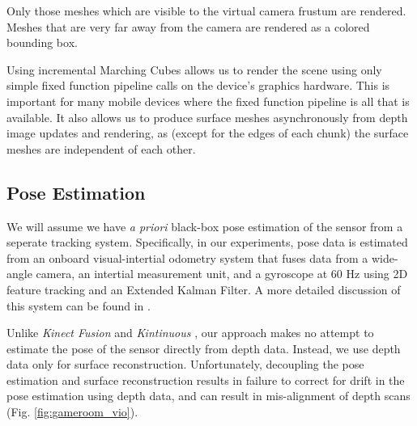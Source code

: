\documentclass[10pt,twocolumn,letterpaper]{article}
\begin{document}
Only those meshes which are visible to the virtual camera frustum are rendered.
Meshes that are very far away from the camera are rendered as a colored bounding
box.

Using incremental Marching Cubes allows us to render the scene using only simple
fixed function pipeline calls on the device's graphics hardware. This is
important for many mobile devices where the fixed function pipeline is all that
is available. It also allows us to produce surface meshes asynchronously from
depth image updates and rendering, as (except for the edges of  each chunk) the
surface meshes are independent of each other.

\subsection{Pose Estimation}
We will assume we  have \textit{a priori} black-box pose estimation of
the sensor from a seperate tracking system. Specifically, in our experiments,
pose data is estimated from an onboard visual-intertial odometry system that
fuses data from a wide-angle camera, an intertial measurement unit, and a
gyroscope at 60 Hz using 2D feature tracking and an Extended Kalman Filter. A
more detailed discussion of this system can be found in \cite{VINS}. 

Unlike \textit{Kinect Fusion} \cite{Newcombe} and \textit{Kintinuous}
\cite{Whelan2013}, our approach makes no attempt to estimate the pose of the
sensor directly from depth data. Instead, we use depth data only for surface
reconstruction. Unfortunately, decoupling the pose estimation and surface
reconstruction results in failure to correct for drift in the pose estimation
using depth data, and can result in mis-alignment of depth scans (Fig.
\ref{fig:gameroom_vio}).
\end{document}
